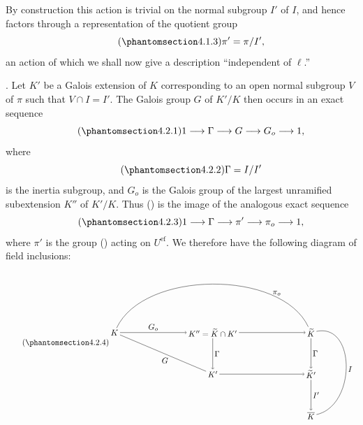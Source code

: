 By construction this action is trivial on the normal subgroup $I'$ of
$I$, and hence factors through a representation of the quotient group
\begin{equation}\tag{\SGARefTarget{sga7.sga7i.eix.n4-1-3}{4.1.3}}
 \pi'=\pi/I',
\end{equation}
an action of which we shall now give a description ``independent of
$\ell$.''

\medskip
\noindent
{}. Let $K'$ be a Galois extension of $K$ corresponding to an open
normal subgroup $V$ of $\pi$ such that $V\cap I=I'$.  The Galois group
$G$ of $K'/K$ then occurs in an exact sequence
\begin{equation}\tag{\SGARefTarget{sga7.sga7i.eix.n4-2-1}{4.2.1}}
 1\longrightarrow\Gamma\longrightarrow G\longrightarrow G_o
 \longrightarrow1,
\end{equation}
where
\begin{equation}\tag{\SGARefTarget{sga7.sga7i.eix.n4-2-2}{4.2.2}}
 \Gamma=I/I'
\end{equation}
is the inertia subgroup, and $G_o$ is the Galois group of the largest
unramified subextension $K''$ of $K'/K$.  Thus () is the image of the
analogous exact sequence
\begin{equation}\tag{\SGARefTarget{sga7.sga7i.eix.n4-2-3}{4.2.3}}
 1\longrightarrow\Gamma\longrightarrow\pi'\longrightarrow\pi_o
 \longrightarrow1,
\end{equation}
where $\pi'$ is the group () acting on $U^{\mathrm{ef}}$.  We
therefore have the following diagram of field inclusions:
\begin{equation}\tag{\SGARefTarget{sga7.sga7i.eix.n4-2-4}{4.2.4}}
\begin{tikzpicture}[baseline=(current bounding box.center),
  every node/.style={inner sep=2pt}]
  \node (K) at (0,0) {$K$};
  \node (Ktwo) at (4.25,0) {$K''=\widetilde K\cap K'$};
  \node (Kt) at (8.5,0) {$\widetilde K$};
  \node (Kp) at (4.25,-1.8) {$K'$};
  \node (Ktp) at (8.5,-1.8) {$\widetilde K'$};
  \node (Kb) at (8.5,-3.6) {$\overline K$};
  \draw[->] (K) -- node[above] {$G_o$} (Ktwo);
  \draw[->] (Ktwo) -- (Kt);
  \draw[->] (Ktwo) -- node[right] {$\Gamma$} (Kp);
  \draw[->] (Kp) -- (Ktp);
  \draw[->] (Kt) -- node[right] {$\Gamma$} (Ktp);
  \draw[->] (Ktp) -- node[right] {$I'$} (Kb);
  \draw[-] (K) -- node[below left,pos=.58] {$G$} (Kp);
  \draw[-] (K) to[out=65,in=115,looseness=.85]
    node[above,pos=.78] {$\pi_o$} (Kt);
  \draw[-] (Kt) to[out=12,in=12,looseness=1.25]
    node[right,pos=.52] {$I$} (Kb);
\end{tikzpicture}
\end{equation}

